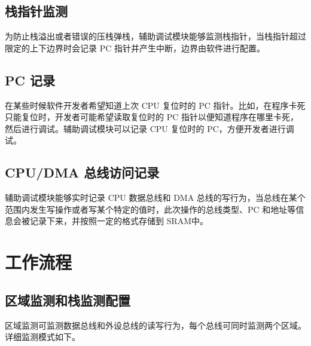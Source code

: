 \documentclass[main\_\_CN.tex]{subfiles}
\begin{document}
\subsection{栈指针监测}
为防止栈溢出或者错误的压栈弹栈，辅助调试模块能够监测栈指针，当栈指针超过限定的上下边界时会记录 PC 指针并产生中断，边界由软件进行配置。

\subsection{PC 记录}
在某些时候软件开发者希望知道上次 CPU 复位时的 PC 指针。比如，在程序卡死只能复位时，开发者可能希望读取复位时的 PC 指针以便知道程序在哪里卡死，然后进行调试。辅助调试模块可以记录 CPU 复位时的 PC，方便开发者进行调试。

\subsection{CPU/DMA 总线访问记录}
辅助调试模块能够实时记录 CPU 数据总线和 DMA 总线的写行为，当总线在某个范围内发生写操作或者写某个特定的值时，此次操作的总线类型、PC 和地址等信息会被记录下来，并按照一定的格式存储到 SRAM中。

\section{工作流程}
\label{sec:dbgassist-recommended-operation}

\subsection{区域监测和栈监测配置}

区域监测可监测数据总线和外设总线的读写行为，每个总线可同时监测两个区域。详细监测模式如下。
\end{document}

